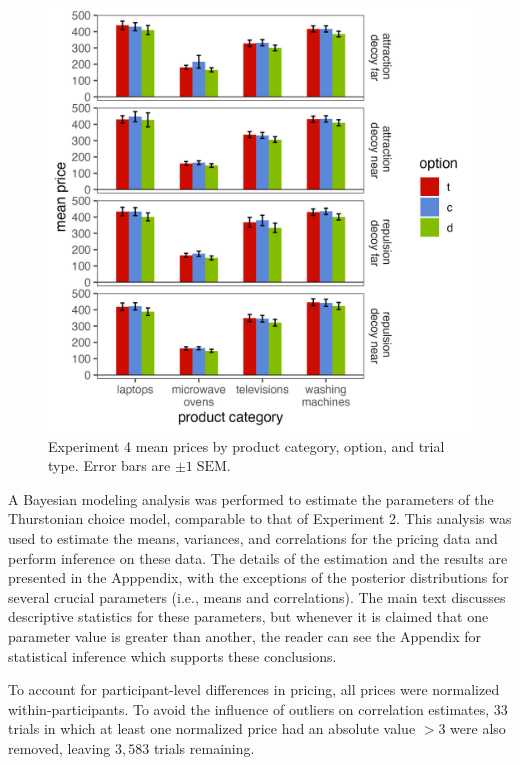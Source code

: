 \begin{figure}
    \centering
    \includegraphics[width=130mm,scale=0.5]{figures/price_m_by_effect_category.jpeg}
    \caption{Experiment 4 mean prices by product category, option, and trial type. Error bars are $\pm 1\;\text{SEM}$.}
    \label{fig:price_m_by_effect_category}
\end{figure}

A Bayesian modeling analysis was performed to estimate the parameters of the Thurstonian choice model, comparable to that of Experiment 2. This analysis was used to estimate the means, variances, and correlations for the pricing data and perform inference on these data. The details of the estimation and the results are presented in the Apppendix, with the exceptions of the posterior distributions for several crucial parameters (i.e., means and correlations). The main text discusses descriptive statistics for these parameters, but whenever it is claimed that one parameter value is greater than another, the reader can see the Appendix for statistical inference which supports these conclusions. 

To account for participant-level differences in pricing, all prices were normalized within-participants. To avoid the influence of outliers on correlation estimates, $33$ trials in which at least one normalized price had an absolute value $>3$ were also removed, leaving $3,583$ trials remaining. 

